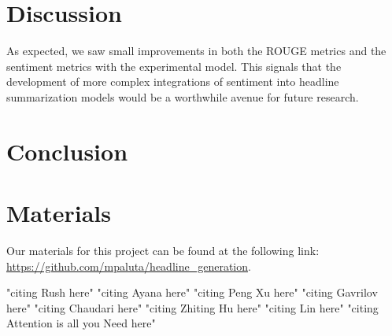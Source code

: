 \documentclass[11pt]{article}
\begin{document}
\section{Discussion}

As expected, we saw small improvements in both the ROUGE metrics and the sentiment metrics with the experimental model. This signals that the development of more complex integrations of sentiment into headline summarization models would be a worthwhile avenue for future research. 

\section{Conclusion}



\section{Materials}
Our materials for this project can be found at the following link:
\url{https://github.com/mpaluta/headline_generation}.

"citing Rush here" \citep{rush2015neural}
"citing Ayana here" \cite{Ayana2017}
"citing Peng Xu here" \cite{DBLP:journals/corr/abs-1902-07110}
"citing Gavrilov here" \cite{DBLP:journals/corr/abs-1901-07786}
"citing Chaudari here" \cite{DBLP:journals/corr/abs-1802-09426}
"citing Zhiting Hu here" \cite{DBLP:journals/corr/HuYLSX17}
"citing Lin here" \cite{lin-2004-rouge}
"citing Attention is all you Need here" \cite{DBLP:journals/corr/VaswaniSPUJGKP17}



\end{document}
